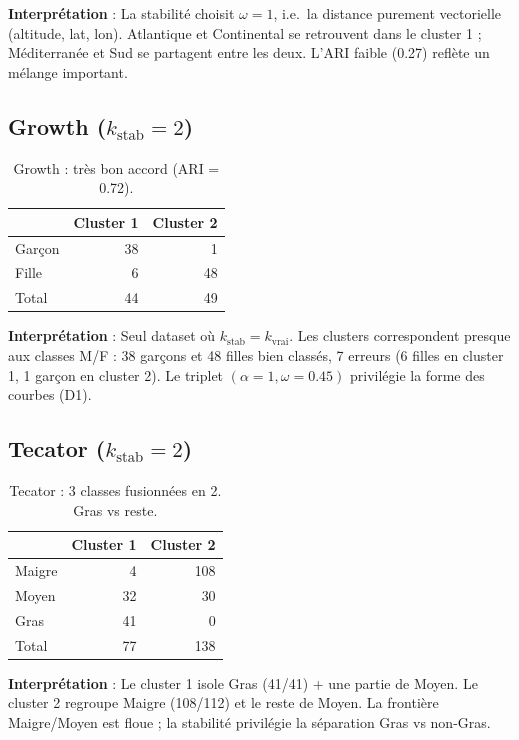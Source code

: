 \documentclass[11pt, a4paper]{article}
\begin{document}
\textbf{Interprétation} : La stabilité choisit $\omega = 1$, i.e.\ la
distance purement vectorielle (altitude, lat, lon). Atlantique et Continental
se retrouvent dans le cluster 1 ; Méditerranée et Sud se partagent entre les
deux. L'ARI faible (0.27) reflète un mélange important.

\subsection{Growth ($k_{\mathrm{stab}} = 2$)}

\begin{table}[H]
\centering
\begin{tabular}{lrr}
\toprule
& Cluster 1 & Cluster 2 \\
\midrule
Garçon & 38 & 1 \\
Fille  & 6  & 48 \\
\midrule
Total  & 44 & 49 \\
\bottomrule
\end{tabular}
\caption{Growth : très bon accord (ARI = 0.72).}
\end{table}

\textbf{Interprétation} : Seul dataset où $k_{\mathrm{stab}} = k_{\mathrm{vrai}}$.
Les clusters correspondent presque aux classes M/F : 38 garçons et 48 filles
bien classés, 7 erreurs (6 filles en cluster 1, 1 garçon en cluster 2).
Le triplet $(\alpha=1, \omega=0.45)$ privilégie la forme des courbes (D1).

\subsection{Tecator ($k_{\mathrm{stab}} = 2$)}

\begin{table}[H]
\centering
\begin{tabular}{lrr}
\toprule
& Cluster 1 & Cluster 2 \\
\midrule
Maigre  & 4  & 108 \\
Moyen   & 32 & 30 \\
Gras    & 41 & 0 \\
\midrule
Total   & 77 & 138 \\
\bottomrule
\end{tabular}
\caption{Tecator : 3 classes fusionnées en 2. Gras vs reste.}
\end{table}

\textbf{Interprétation} : Le cluster 1 isole Gras (41/41) + une partie de
Moyen. Le cluster 2 regroupe Maigre (108/112) et le reste de Moyen. La
frontière Maigre/Moyen est floue ; la stabilité privilégie la séparation
Gras vs non-Gras.
\end{document}
